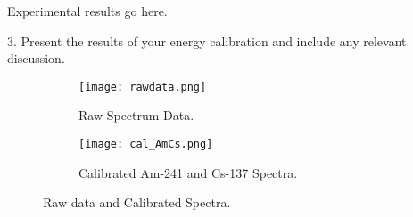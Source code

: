 Experimental results go here.

3. Present the results of your energy calibration and include any relevant discussion.







\begin{figure}[h!]
  \begin{subfigure}[b]{0.6\linewidth}
    \texttt{[image: rawdata.png]}
    \caption{Raw Spectrum Data.}
  \end{subfigure}
  \begin{subfigure}[b]{0.6\linewidth}
    \texttt{[image: cal\_AmCs.png]}
    \caption{Calibrated Am-241 and Cs-137 Spectra.}
  \end{subfigure}
  \caption{Raw data and Calibrated Spectra.}

\end{figure}



